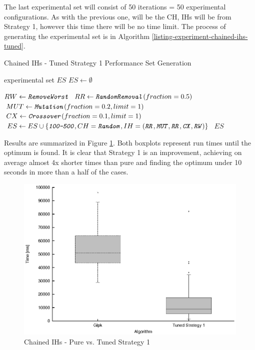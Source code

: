 The last experimental set will consist of 50 iterations = 50 experimental configurations. As with the previous one,  will be the CH, IHs will be from Strategy 1, however this time there will be no time limit. The process of generating the experimental set is in Algorithm \ref{listing-experiment-chained-ihs-tuned}.

\begin{algorithm}
\caption{Chained IHs - Tuned Strategy 1 Performance Set Generation}
\label{listing-experiment-chained-ihs-tuned}
\begin{algorithmic}
\ENSURE experimental set $ES$
\STATE $ES \gets \emptyset$

\STATE $RW \gets \texttt{\textit{RemoveWorst}}$
\STATE $RR \gets \texttt{\textit{RandomRemoval}}(fraction = 0.5)$
\STATE $MUT \gets \texttt{\textit{Mutation}}(fraction = 0.2, limit = 1)$
\STATE $CX \gets \texttt{\textit{Crossover}}(fraction = 0.1, limit = 1)$
  \STATE $ES \gets ES \cup \{\texttt{\textit{100-500}}, CH = \texttt{\textit{Random}}, IH = (\texttt{\textit{RR}}, \texttt{\textit{MUT}}, \texttt{\textit{RR}}, \texttt{\textit{CX}}, \texttt{\textit{RW}})\}$
\ENDFOR
\RETURN $ES$
\end{algorithmic}
\end{algorithm}

Results are summarized in Figure \ref{image-experiment-chained-ihs-tuned}. Both boxplots represent run times until the optimum is found. It is clear that Strategy 1 is an improvement, achieving on average almost 4x shorter times than pure  and finding the optimum under 10 seconds in more than a half of the cases.

\begin{figure}
  \caption{Chained IHs - Pure  vs. Tuned Strategy 1}
  \label{image-experiment-chained-ihs-tuned}
  \centering
    \includegraphics[width=\textwidth]{images/experiments/chained-ihs-tuned}
\end{figure}

